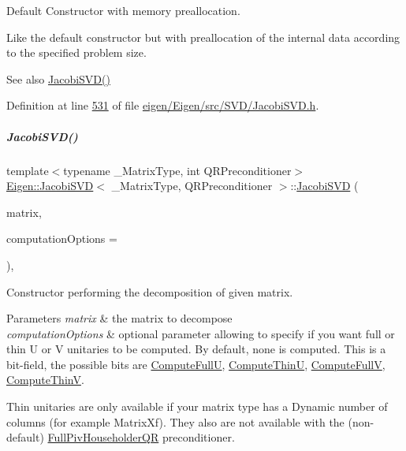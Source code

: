 Default Constructor with memory preallocation. 

Like the default constructor but with preallocation of the internal data according to the specified problem size. \begin{DoxySeeAlso}{See also}
\hyperlink{group___s_v_d___module_a55315ab9cd060019a5ad07be798ff3b9}{Jacobi\+S\+V\+D()} 
\end{DoxySeeAlso}


Definition at line \hyperlink{eigen_2_eigen_2src_2_s_v_d_2_jacobi_s_v_d_8h_source_l00531}{531} of file \hyperlink{eigen_2_eigen_2src_2_s_v_d_2_jacobi_s_v_d_8h_source}{eigen/\+Eigen/src/\+S\+V\+D/\+Jacobi\+S\+V\+D.\+h}.

\mbox{\label{group___s_v_d___module_abfd1dd454a6e3edec7feecd97c818a78}} 
\subparagraph{\texorpdfstring{Jacobi\+S\+V\+D()}{JacobiSVD()}\hspace{0.1cm}{\footnotesize\ttfamily [3/6]}}
{\footnotesize\ttfamily template$<$typename \+\_\+\+Matrix\+Type, int Q\+R\+Preconditioner$>$ \\
\hyperlink{group___s_v_d___module_class_eigen_1_1_jacobi_s_v_d}{Eigen\+::\+Jacobi\+S\+VD}$<$ \+\_\+\+Matrix\+Type, Q\+R\+Preconditioner $>$\+::\hyperlink{group___s_v_d___module_class_eigen_1_1_jacobi_s_v_d}{Jacobi\+S\+VD} (\begin{DoxyParamCaption}\item[{const Matrix\+Type \&}]{matrix,  }\item[{unsigned int}]{computation\+Options = {} }\end{DoxyParamCaption})\hspace{0.3cm}{\ttfamily [inline]}, {\ttfamily [explicit]}}



Constructor performing the decomposition of given matrix. 


\begin{DoxyParams}{Parameters}
{\em matrix} & the matrix to decompose \\
\hline
{\em computation\+Options} & optional parameter allowing to specify if you want full or thin U or V unitaries to be computed. By default, none is computed. This is a bit-\/field, the possible bits are \hyperlink{group__enums_ggae3e239fb70022eb8747994cf5d68b4a9a2b4f91ca5859a4159dbfe8090043817f}{Compute\+FullU}, \hyperlink{group__enums_ggae3e239fb70022eb8747994cf5d68b4a9af8c742a1aa87773e165eae406c9ccaf8}{Compute\+ThinU}, \hyperlink{group__enums_ggae3e239fb70022eb8747994cf5d68b4a9a52c6f7e80bbf9a42297c88f700245b51}{Compute\+FullV}, \hyperlink{group__enums_ggae3e239fb70022eb8747994cf5d68b4a9a1055e53fa95c8ae04a07ebb72cfafd95}{Compute\+ThinV}.\\
\hline
\end{DoxyParams}
Thin unitaries are only available if your matrix type has a Dynamic number of columns (for example Matrix\+Xf). They also are not available with the (non-\/default) \hyperlink{group___q_r___module_class_eigen_1_1_full_piv_householder_q_r}{Full\+Piv\+Householder\+QR} preconditioner. 

